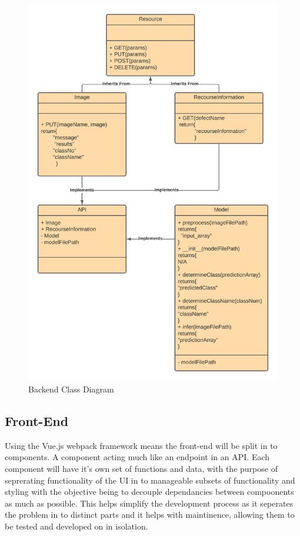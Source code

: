     \begin{figure}[H]
      \begin{center}
        \includegraphics[scale=0.7]{Images/API_InheritenceV2}
        \caption{Backend Class Diagram}
        \label{fig:api_inheritence}
      \end{center}
    \end{figure}

    \subsection{Front-End}
      Using the Vue.js webpack framework means the front-end will be split in to components. A component acting much like an endpoint in an API. Each component will have it's own set of functions and data, with the purpose of seprerating functionality of the UI in to manageable subsets of functionality and styling with the objective being to decouple dependancies between compoonents as much as possible. This helps simplify the development process as it seperates the problem in to distinct parts and it helps with maintinence, allowing them to be tested and developed on in isolation.

